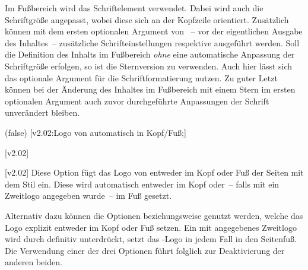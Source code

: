\begin{DeclareEntity*}{}
\begin{DeclareEntity*}{}
\begin{DeclareEntity*}{}
\begin{Declaration}
\begin{Declaration}
%
Im Fußbereich wird das Schriftelement  verwendet. Dabei wird 
auch die Schriftgröße angepasst, wobei diese sich an der Kopfzeile orientiert. 
Zusätzlich können mit dem ersten optionalen Argument von ~-- 
vor der eigentlichen Ausgabe des Inhaltes~-- zusätzliche Schrifteinstellungen 
respektive  ausgeführt werden. Soll die Definition des 
Inhalts im Fußbereich \emph{ohne} eine automatische Anpassung der Schriftgröße 
erfolgen, so ist die Sternversion  zu verwenden. Auch hier 
lässt sich das optionale Argument für die Schriftformatierung nutzen.
%
Zu guter Letzt können bei der Änderung des Inhaltes im Fußbereich mit einem 
Stern im ersten optionalen Argument 
 auch zuvor 
durchgeführte Anpassungen der Schrift unverändert bleiben.
\end{Declaration}
\end{Declaration}

\begin{Declaration}
  {}
  (false)
  [v2.02:Logo von \DDC automatisch in Kopf/Fuß;]
\begin{Declaration}
  {}
  [v2.02]
\begin{Declaration}
  {}
  [v2.02]
Diese Option fügt das Logo von \DDC entweder im Kopf oder Fuß der Seiten mit 
dem Stil  ein. Diese wird automatisch entweder im Kopf 
oder~-- falls mit  ein Zweitlogo angegeben wurde~-- im Fuß 
gesetzt.

Alternativ dazu können die Optionen  beziehungsweise 
 genutzt werden, welche das Logo explizit entweder im Kopf oder 
Fuß setzen. Ein mit  angegebenes Zweitlogo wird durch 
 definitiv unterdrückt,  setzt 
das \DDC-Logo in jedem Fall in den Seitenfuß. Die Verwendung einer der drei 
Optionen führt folglich zur Deaktivierung der anderen beiden.


\end{Declaration}
\end{Declaration}
\end{Declaration}
\end{DeclareEntity*}
\end{DeclareEntity*}
\end{DeclareEntity*}
